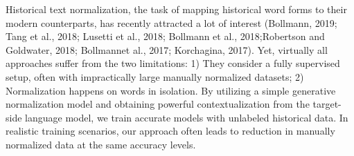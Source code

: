Historical text normalization, the task of mapping historical word forms to their modern counterparts, has recently attracted a lot of interest (Bollmann, 2019; Tang et al., 2018; Lusetti et al., 2018; Bollmann et al., 2018;Robertson and Goldwater, 2018; Bollmannet al., 2017; Korchagina, 2017). Yet, virtually all approaches suffer from the two limitations: 1) They consider a fully supervised setup, often with impractically large manually normalized datasets; 2) Normalization happens on words in isolation. By utilizing a simple generative normalization model and obtaining powerful contextualization from the target-side language model, we train accurate models with unlabeled historical data. In realistic training scenarios, our approach often leads to reduction in manually normalized data at the same accuracy levels.
